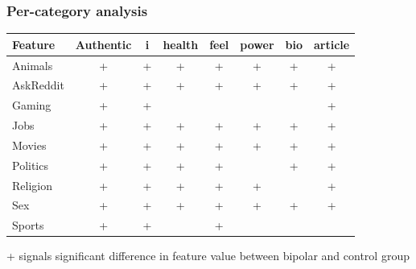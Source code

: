 \documentclass{beamer}
\newcommand{\maybe}[1]{\textcolor{gray}{#1}}
\begin{document}
\begin{frame}
  \frametitle{Per-category analysis}
\begin{table}[]
\begin{tabular}{lccccccc}
  \toprule
Feature   & Authentic & i & health & feel & power & bio & article \\
\midrule
Animals&+&+&+&+&+&+&+\\
AskReddit&+&+&+&+&+&+&+\\
Gaming&+&+&&&&&+\\
Jobs&+&+&+&+&+&+&+\\
Movies&+&+&+&+&+&+&+\\
Politics&+&+&+&+&&+&+\\
Religion&+&+&+&+&+&&+\\
Sex&+&+&+&+&+&+&+\\
Sports&+&+&&+&&&
\bottomrule
\end{tabular}
\end{table}

+ signals significant difference in feature value between bipolar and control group


\end{frame}
\end{document}
